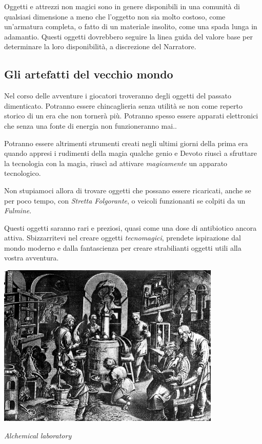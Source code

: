\begin{multicols}{2}
Oggetti e attrezzi non magici sono in genere disponibili in una comunità di qualsiasi dimensione a meno che l'oggetto non sia molto costoso, come un'armatura completa, o fatto di un materiale insolito, come una spada lunga in adamantio. Questi oggetti dovrebbero seguire la linea guida del valore base per determinare la loro disponibilità, a discrezione del Narratore.

\subsection{Gli artefatti del vecchio mondo}

Nel corso delle avventure i giocatori troveranno degli oggetti del passato dimenticato. Potranno essere chincaglieria senza utilità se non come reperto storico di un era che non tornerà più. Potranno spesso essere apparati elettronici che senza una fonte di energia non funzioneranno mai..

Potranno essere altrimenti strumenti creati negli ultimi giorni della prima era quando appresi i rudimenti della magia qualche genio e Devoto riuscì a sfruttare la tecnologia con la magia, riuscì ad attivare \emph{magicamente} un apparato tecnologico.

Non stupiamoci allora di trovare oggetti che possano essere ricaricati, anche se per poco tempo, con \emph{Stretta Folgorante}, o veicoli funzionanti se colpiti da un \emph{Fulmine}.

Questi oggetti saranno rari e preziosi, quasi come una dose di antibiotico ancora attiva. Sbizzarritevi nel creare oggetti \emph{tecnomagici}, prendete ispirazione dal mondo moderno e dalla fantascienza per creare strabilianti oggetti utili alla vostra avventura.

\end{multicols}

\vfill

\begin{center}
\includegraphics[keepaspectratio,width=0.8\textwidth]{immagini/Alchemical_laboratory_Wellcome_M0005193.png}

\emph{Alchemical laboratory}
\end{center}

\pagebreak

